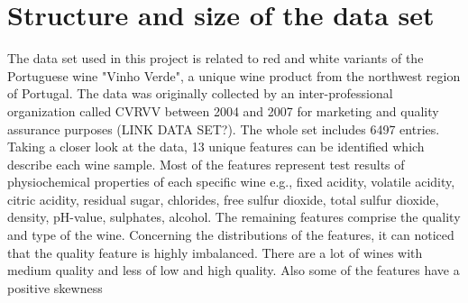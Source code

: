 \chapter{Structure and size of the data set}\label{sec:data_structure}


The data set used in this project is related to red and white variants of the Portuguese wine "Vinho Verde", a unique wine product from the northwest region of Portugal. The data was originally collected by an inter-professional organization called CVRVV between 2004 and 2007 for marketing and quality assurance purposes (LINK DATA SET?). The whole set includes 6497 entries.
Taking a closer look at the data, 13 unique features can be identified which describe each wine sample. Most of the features represent test results of physiochemical properties of each specific wine e.g., fixed acidity, volatile acidity, citric acidity, residual sugar, chlorides, free sulfur dioxide, total sulfur dioxide, density, pH-value, sulphates, alcohol. The remaining features comprise the quality and type of the wine. Concerning the distributions of the features, it can noticed that the quality feature is highly imbalanced. There are a lot of wines with medium quality and less of low and high quality. Also some of the features have a positive skewness